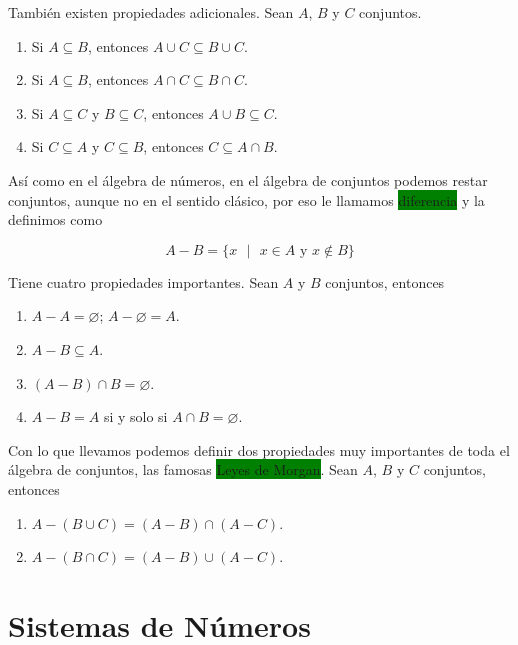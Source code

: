 \documentclass[11pt]{article}
\begin{document}
También existen propiedades adicionales. Sean $A$, $B$ y $C$ conjuntos.

\begin{enumerate}
    \item Si $A \subseteq B$, entonces $A \cup C \subseteq B \cup C$.

    \item Si $A \subseteq B$, entonces $A \cap C \subseteq B \cap C$.

    \item Si $A \subseteq C$ y $B \subseteq C$, entonces $A \cup B \subseteq C$.

    \item Si $C \subseteq A$ y $C \subseteq B$, entonces $C \subseteq A \cap B$.
\end{enumerate}

Así como en el álgebra de números, en el álgebra de conjuntos podemos restar conjuntos, aunque no en el sentido clásico, por eso le llamamos \colorbox{Green}{diferencia} y la definimos como

\[
A-B=\{x\text{ }| \text{ } x \in A \text{ y } x \notin B\}
\]

Tiene cuatro propiedades importantes. Sean $A$ y $B$ conjuntos, entonces

\begin{enumerate}
    \item $A - A = \varnothing$; $A - \varnothing = A$.

    \item $A - B \subseteq A$.

    \item $(A - B) \cap B = \varnothing$.

    \item $A - B = A$ si y solo si $A \cap B = \varnothing$.
\end{enumerate}

Con lo que llevamos podemos definir dos propiedades muy importantes de toda el álgebra de conjuntos, las famosas \colorbox{Green}{Leyes de Morgan}. Sean $A$, $B$ y $C$ conjuntos, entonces

\begin{enumerate}
    \item $A - (B \cup C) = (A - B) \cap (A - C)$.

    \item $A - (B \cap C) = (A - B) \cup (A - C)$.
\end{enumerate}

\section{Sistemas de Números}
\end{document}
